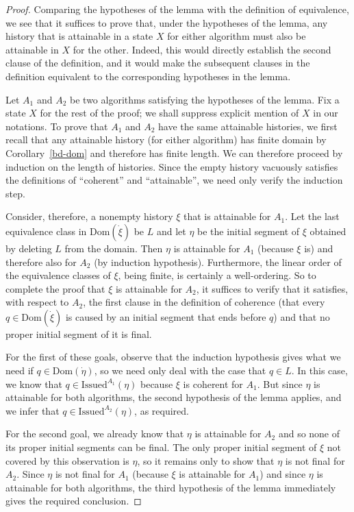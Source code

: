 \documentclass{LMCS}
\theoremstyle{definition}
\newcommand{\ans}{\dot}
\newcommand{\dom}[1]{\ensuremath{{\text{Dom}}(#1)}}
\newcommand{\Issued}{\text{Issued}}
\begin{document}
\begin{proof}
Comparing the hypotheses of the lemma with the definition of
equivalence, we see that it suffices to prove that, under the
hypotheses of the lemma, any history that is attainable in a state $X$
for either algorithm must also be attainable in $X$ for the other.
Indeed, this would directly establish the second clause of the
definition, and it would make the subsequent clauses in the definition
equivalent to the corresponding hypotheses in the lemma.

Let $A_1$ and $A_2$ be two algorithms satisfying the hypotheses of the
lemma.  Fix a state $X$ for the rest of the proof; we shall suppress
explicit mention of $X$ in our notations.  To prove that $A_1$ and
$A_2$ have the same attainable histories, we first recall that any
attainable history (for either algorithm) has finite domain by
Corollary~\ref{bd-dom} and therefore has finite length.  We can
therefore proceed by induction on the length of histories.  Since the
empty history vacuously satisfies the definitions of ``coherent'' and
``attainable'', we need only verify the induction step.

Consider, therefore, a nonempty history $\xi$ that is attainable for
$A_1$.  Let the last equivalence class in $\dom{\ans\xi}$ be $L$ and let
$\eta$ be the initial segment of $\xi$ obtained by deleting $L$ from
the domain.  Then $\eta$ is attainable for $A_1$ (because $\xi$ is)
and therefore also for $A_2$ (by induction hypothesis).  Furthermore,
the linear order of the equivalence classes of $\xi$, being finite,
is certainly a well-ordering.  So to complete the proof that $\xi$ is
attainable for $A_2$, it suffices to verify that it satisfies, with
respect to $A_2$, the first clause in the definition of coherence
(that every $q\in\dom{\ans\xi}$ is caused by an initial segment that ends
before $q$) and that no proper initial segment of it is final.

For the first of these goals, observe that the induction hypothesis
gives what we need if $q\in\dom{\ans\eta}$, so we need only deal with the
case that $q\in L$.  In this case, we know that
$q\in\Issued^{A_1}(\eta)$ because $\xi$ is coherent for $A_1$.  But
since $\eta$ is attainable for both algorithms, the second hypothesis
of the lemma applies, and we infer that $q\in\Issued^{A_2}(\eta)$, as
required.

For the second goal, we already know that $\eta$ is attainable for
$A_2$ and so none of its proper initial segments can be final.  The
only proper initial segment of $\xi$ not covered by this observation
is $\eta$, so it remains only to show that $\eta$ is not final for
$A_2$.  Since $\eta$ is not final for $A_1$ (because $\xi$ is
attainable for $A_1$) and since $\eta$ is attainable for both
algorithms, the third hypothesis of the lemma immediately gives the
required conclusion.
\end{proof}
\end{document}
